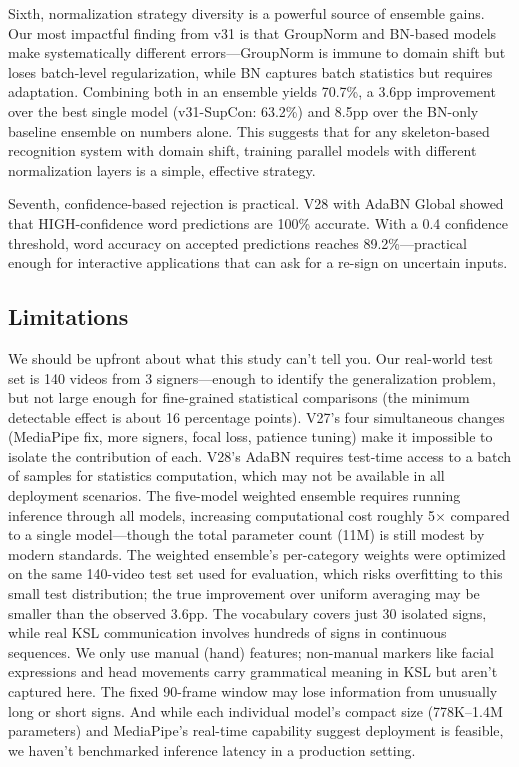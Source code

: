\documentclass[conference]{IEEEtran}
\begin{document}
Sixth, normalization strategy diversity is a powerful source of ensemble gains. Our most impactful finding from v31 is that GroupNorm and BN-based models make systematically different errors---GroupNorm is immune to domain shift but loses batch-level regularization, while BN captures batch statistics but requires adaptation. Combining both in an ensemble yields 70.7\%, a 3.6pp improvement over the best single model (v31-SupCon: 63.2\%) and 8.5pp over the BN-only baseline ensemble on numbers alone. This suggests that for any skeleton-based recognition system with domain shift, training parallel models with different normalization layers is a simple, effective strategy.

Seventh, confidence-based rejection is practical. V28 with AdaBN Global showed that HIGH-confidence word predictions are 100\% accurate. With a 0.4 confidence threshold, word accuracy on accepted predictions reaches 89.2\%---practical enough for interactive applications that can ask for a re-sign on uncertain inputs.

\subsection{Limitations}

We should be upfront about what this study can't tell you. Our real-world test set is 140 videos from 3 signers---enough to identify the generalization problem, but not large enough for fine-grained statistical comparisons (the minimum detectable effect is about 16 percentage points). V27's four simultaneous changes (MediaPipe fix, more signers, focal loss, patience tuning) make it impossible to isolate the contribution of each. V28's AdaBN requires test-time access to a batch of samples for statistics computation, which may not be available in all deployment scenarios. The five-model weighted ensemble requires running inference through all models, increasing computational cost roughly 5$\times$ compared to a single model---though the total parameter count (11M) is still modest by modern standards. The weighted ensemble's per-category weights were optimized on the same 140-video test set used for evaluation, which risks overfitting to this small test distribution; the true improvement over uniform averaging may be smaller than the observed 3.6pp. The vocabulary covers just 30 isolated signs, while real KSL communication involves hundreds of signs in continuous sequences. We only use manual (hand) features; non-manual markers like facial expressions and head movements carry grammatical meaning in KSL but aren't captured here. The fixed 90-frame window may lose information from unusually long or short signs. And while each individual model's compact size (778K--1.4M parameters) and MediaPipe's real-time capability suggest deployment is feasible, we haven't benchmarked inference latency in a production setting.
\end{document}
